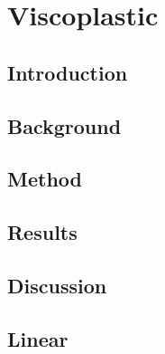 \documentclass[letterpaper,10pt,english]{jupyterBook}
\begin{document}
\chapter{Viscoplastic}
\label{\detokenize{content/chapter_05_viscoplastic/abstract:viscoplastic}}\label{\detokenize{content/chapter_05_viscoplastic/abstract::doc}}

\section{Introduction}
\label{\detokenize{content/chapter_05_viscoplastic/section01_introduction:introduction}}\label{\detokenize{content/chapter_05_viscoplastic/section01_introduction::doc}}

\section{Background}
\label{\detokenize{content/chapter_05_viscoplastic/section02_background:background}}\label{\detokenize{content/chapter_05_viscoplastic/section02_background::doc}}

\section{Method}
\label{\detokenize{content/chapter_05_viscoplastic/section03_methods:method}}\label{\detokenize{content/chapter_05_viscoplastic/section03_methods::doc}}

\section{Results}
\label{\detokenize{content/chapter_05_viscoplastic/section04_results:results}}\label{\detokenize{content/chapter_05_viscoplastic/section04_results::doc}}

\section{Discussion}
\label{\detokenize{content/chapter_05_viscoplastic/section05_discussion:discussion}}\label{\detokenize{content/chapter_05_viscoplastic/section05_discussion::doc}}

\section{Linear}
\label{\detokenize{content/chapter_05_viscoplastic/conclusion:linear}}\label{\detokenize{content/chapter_05_viscoplastic/conclusion::doc}}
\end{document}
